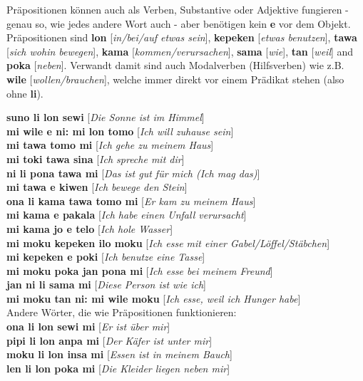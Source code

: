 \documentclass[10pt,a4paper]{article}
\begin{document}
Präpositionen können auch als Verben, Substantive oder Adjektive fungieren - genau so, wie jedes andere Wort auch - aber benötigen kein \textbf{e} vor dem Objekt. Präpositionen sind \textbf{lon} [\textit{in/bei/auf etwas sein}], \textbf{kepeken} [\textit{etwas benutzen}], \textbf{tawa} [\textit{sich wohin bewegen}], \textbf{kama} [\textit{kommen/verursachen}], \textbf{sama} [\textit{wie}], \textbf{tan} [\textit{weil}] and \textbf{poka} [\textit{neben}]. Verwandt damit sind auch Modalverben (Hilfsverben) wie z.B. \textbf{wile} [\textit{wollen/brauchen}], welche immer direkt vor einem Prädikat stehen (also ohne \textbf{li}).

\begin{multicols}{2}
\noindent\textbf{suno li lon sewi} [\textit{Die Sonne ist im Himmel}]\\
\noindent\textbf{mi wile e ni: mi lon tomo} [\textit{Ich will zuhause sein}]\\
\noindent\textbf{mi tawa tomo mi} [\textit{Ich gehe zu meinem Haus}]\\
\noindent\textbf{mi toki tawa sina} [\textit{Ich spreche mit dir}]\\
\noindent\textbf{ni li pona tawa mi} [\textit{Das ist gut für mich (Ich mag das)}]\\
\noindent\textbf{mi tawa e kiwen} [\textit{Ich bewege den Stein}]\\
\noindent\textbf{ona li kama tawa tomo mi} [\textit{Er kam zu meinem Haus}]\\
\noindent\textbf{mi kama e pakala} [\textit{Ich habe einen Unfall verursacht}]\\
\noindent\textbf{mi kama jo e telo} [\textit{Ich hole Wasser}]\\
\noindent\textbf{mi moku kepeken ilo moku} [\textit{Ich esse mit einer Gabel/Löffel/Stäbchen}]\\
\noindent\textbf{mi kepeken e poki} [\textit{Ich benutze eine Tasse}]\\
\noindent\textbf{mi moku poka jan pona mi} [\textit{Ich esse bei meinem Freund}]\\
\noindent\textbf{jan ni li sama mi} [\textit{Diese Person ist wie ich}]\\
\noindent\textbf{mi moku tan ni: mi wile moku} [\textit{Ich esse, weil ich Hunger habe}]\\
\noindent Andere Wörter, die wie Präpositionen funktionieren:\\
\noindent\textbf{ona li lon sewi mi} [\textit{Er ist über mir}]\\
\noindent\textbf{pipi li lon anpa mi} [\textit{Der Käfer ist unter mir}]\\
\noindent\textbf{moku li lon insa mi} [\textit{Essen ist in meinem Bauch}]\\
\noindent\textbf{len li lon poka mi} [\textit{Die Kleider liegen neben mir}]
\end{multicols}
\end{document}
